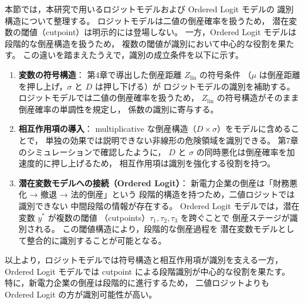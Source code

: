 本節では，本研究で用いるロジットモデルおよび Ordered Logit モデルの
識別構造について整理する。
ロジットモデルは二値の倒産確率を扱うため，
潜在変数の閾値（cutpoint）は明示的には登場しない。
一方，Ordered Logit モデルは段階的な倒産構造を扱うため，
複数の閾値が識別において中心的な役割を果たす。
この違いを踏まえたうえで，識別の成立条件を以下に示す。

\begin{enumerate}
    \item \textbf{変数の符号構造}：  
    第4章で導出した倒産距離 $Z_{\text{lin}}$ の符号条件  
    （$\mu$ は倒産距離を押し上げ，$\sigma$ と $D$ は押し下げる）が  
    ロジットモデルの識別を補助する。  
    ロジットモデルでは二値の倒産確率を扱うため，
    $Z_{\text{lin}}$ の符号構造がそのまま倒産確率の単調性を規定し，
    係数の識別に寄与する。

    \item \textbf{相互作用項の導入}：  
    multiplicative な倒産構造（$D \times \sigma$）をモデルに含めることで，
    単独の効果では説明できない非線形の危険領域を識別できる。  
    第7章のシミュレーションで確認したように，
    $D$ と $\sigma$ の同時悪化は倒産確率を加速度的に押し上げるため，
    相互作用項は識別を強化する役割を持つ。

    \item \textbf{潜在変数モデルへの接続（Ordered Logit）}：  
    新電力企業の倒産は「財務悪化 → 撤退 → 法的倒産」という  
    段階的構造を持つため，二値ロジットでは識別できない  
    中間段階の情報が存在する。  
    Ordered Logit モデルでは，潜在変数 $y^*$ が複数の閾値  
    （cutpoints）$\tau_1, \tau_2, \tau_3$ を跨ぐことで  
    倒産ステージが識別される。  
    この閾値構造により，段階的な倒産過程を  
    潜在変数モデルとして整合的に識別することが可能となる。
\end{enumerate}

以上より，ロジットモデルでは符号構造と相互作用項が識別を支える一方，
Ordered Logit モデルでは cutpoint による段階識別が中心的な役割を果たす。
特に，新電力企業の倒産は段階的に進行するため，
二値ロジットよりも Ordered Logit の方が識別可能性が高い。

